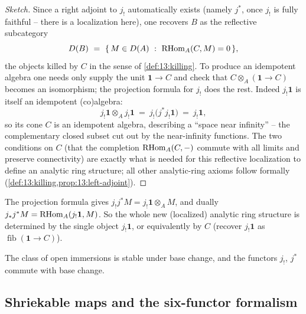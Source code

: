 \begin{proof}[Sketch]
Since a right adjoint to $j_!$ automatically exists (namely $j^*$, once $j_!$ is fully
faithful -- there is a localization here), one recovers $B$ as the reflective
subcategory
\begin{equation*}
D(B)\ =\ \{\,M\in D(A)\ :\ \RHom_A(C,M)=0\,\},
\end{equation*}
the objects killed by $C$ in the sense of \cref{def:13:killing}. To produce an
idempotent algebra one needs only supply the unit $\mathbf 1\to C$ and check that
$C\otimes_A(\mathbf 1\to C)$ becomes an isomorphism; the projection formula for $j_!$
does the rest. Indeed $j_!\mathbf 1$ is itself an idempotent (co)algebra:
\begin{equation*}
j_!\mathbf 1\otimes_A j_!\mathbf 1\ =\ j_!\bigl(j^* j_!\mathbf 1\bigr)\ =\ j_!\mathbf 1,
\end{equation*}
so its cone $C$ is an idempotent algebra, describing a ``space near infinity'' -- the
complementary closed subset cut out by the near-infinity functions. The two conditions
on $C$ (that the completion $\mathrm{RHom}_A(C,-)$ commute with all limits and preserve
connectivity) are exactly what is needed for this reflective localization to define an
analytic ring structure; all other analytic-ring axioms follow formally
(\cref{def:13:killing,prop:13:left-adjoint}).
\end{proof}

\begin{remark}
\label{rmk:16:jshriek-proj}
The projection formula gives $j_!j^*M=j_!\mathbf 1\otimes_A M$, and dually
$j_*j^*M=\mathrm{RHom}_A(j_!\mathbf 1,M)$. So the whole new (localized) analytic ring structure
is determined by the single object $j_!\mathbf 1$, or equivalently by $C$ (recover
$j_!\mathbf 1$ as $\operatorname{fib}(\mathbf 1\to C)$).
\end{remark}

\begin{corollary}
\label{cor:16:open-base-change}
The class of open immersions is stable under base change, and the functors $j_!$, $j^*$
commute with base change.
\end{corollary}

\subsection{Shriekable maps and the six-functor formalism}
\label{subsec:16:shriekable}


